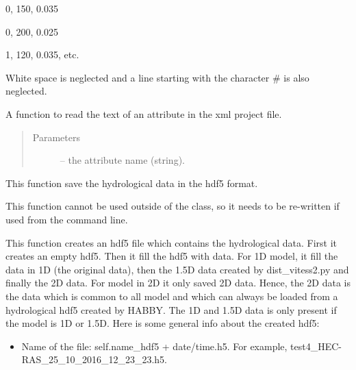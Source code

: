 \documentclass[letterpaper,10pt,english]{sphinxmanual}
\begin{document}
\begin{fulllineitems}
\begin{fulllineitems}
0, 150, 0.035

0, 200, 0.025

1, 120, 0.035, etc.

White space is neglected and a line starting with the character \# is also neglected.

\end{fulllineitems}


\begin{fulllineitems}
\label{\detokenize{index:src_GUI.hydro_GUI_2.SubHydroW.read_attribute_xml}}
A function to read the text of an attribute in the xml project file.
\begin{quote}\begin{description}
\item[{Parameters}] \leavevmode
{} -- the attribute name (string).

\end{description}\end{quote}

\end{fulllineitems}


\begin{fulllineitems}
\label{\detokenize{index:src_GUI.hydro_GUI_2.SubHydroW.save_hdf5}}
This function save the hydrological data in the hdf5 format.


This function cannot be used outside of the class, so it needs to be re-written if used from the command line.

This function creates an hdf5 file which contains the hydrological data. First it creates an empty hdf5.
Then it fill the hdf5 with data. For 1D model, it fill the data in 1D (the original data), then the 1.5D data
created by dist\_vitess2.py and finally the 2D data. For model in 2D it only saved 2D data. Hence, the 2D data
is the data which is common to all model and which can always be loaded from a hydrological hdf5 created by
HABBY. The 1D and 1.5D data is only present if the model is 1D or 1.5D. Here is some general info about the
created hdf5:
\begin{itemize}
\item {} 
Name of the file: self.name\_hdf5 + date/time.h5.  For example, test4\_HEC-RAS\_25\_10\_2016\_12\_23\_23.h5.


\end{itemize}
\end{fulllineitems}
\end{fulllineitems}
\end{document}
